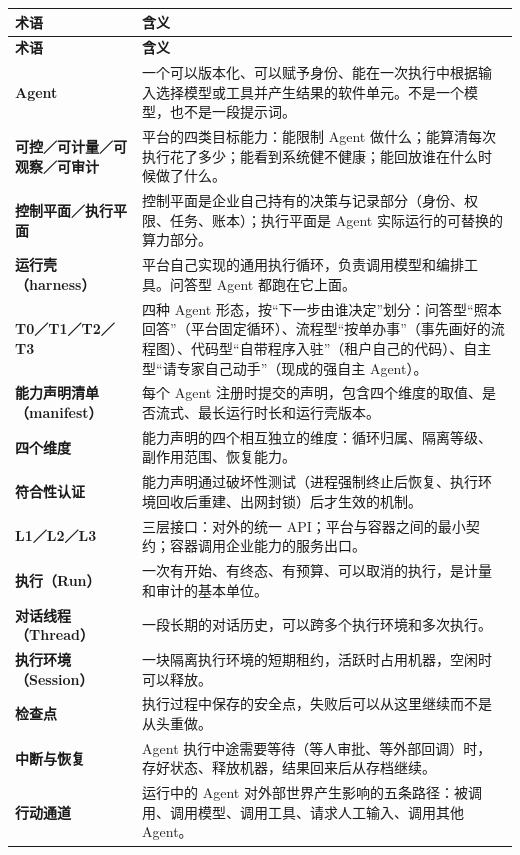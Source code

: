 \begin{longtable}{@{}>{\bfseries}L{3.4cm}L{\dimexpr\textwidth-3.4cm-2\tabcolsep\relax}@{}}
  \toprule
  \textbf{术语} & \textbf{含义}\\
  \midrule
  \endfirsthead
  \toprule
  \textbf{术语} & \textbf{含义}\\
  \midrule
  \endhead
  Agent & 一个可以版本化、可以赋予身份、能在一次执行中根据输入选择模型或工具并产生结果的软件单元。不是一个模型，也不是一段提示词。\\
  可控／可计量／可观察／可审计 & 平台的四类目标能力：能限制 Agent 做什么；能算清每次执行花了多少；能看到系统健不健康；能回放谁在什么时候做了什么。\\
  控制平面／执行平面 & 控制平面是企业自己持有的决策与记录部分（身份、权限、任务、账本）；执行平面是 Agent 实际运行的可替换的算力部分。\\
  运行壳（harness） & 平台自己实现的通用执行循环，负责调用模型和编排工具。问答型 Agent 都跑在它上面。\\
  T0／T1／T2／T3 & 四种 Agent 形态，按“下一步由谁决定”划分：问答型“照本回答”（平台固定循环）、流程型“按单办事”（事先画好的流程图）、代码型“自带程序入驻”（租户自己的代码）、自主型“请专家自己动手”（现成的强自主 Agent）。\\
  能力声明清单（manifest） & 每个 Agent 注册时提交的声明，包含四个维度的取值、是否流式、最长运行时长和运行壳版本。\\
  四个维度 & 能力声明的四个相互独立的维度：循环归属、隔离等级、副作用范围、恢复能力。\\
  符合性认证 & 能力声明通过破坏性测试（进程强制终止后恢复、执行环境回收后重建、出网封锁）后才生效的机制。\\
  L1／L2／L3 & 三层接口：对外的统一 API；平台与容器之间的最小契约；容器调用企业能力的服务出口。\\
  执行（Run） & 一次有开始、有终态、有预算、可以取消的执行，是计量和审计的基本单位。\\
  对话线程（Thread） & 一段长期的对话历史，可以跨多个执行环境和多次执行。\\
  执行环境（Session） & 一块隔离执行环境的短期租约，活跃时占用机器，空闲时可以释放。\\
  检查点 & 执行过程中保存的安全点，失败后可以从这里继续而不是从头重做。\\
  中断与恢复 & Agent 执行中途需要等待（等人审批、等外部回调）时，存好状态、释放机器，结果回来后从存档继续。\\
  行动通道 & 运行中的 Agent 对外部世界产生影响的五条路径：被调用、调用模型、调用工具、请求人工输入、调用其他 Agent。\\

\end{longtable}
